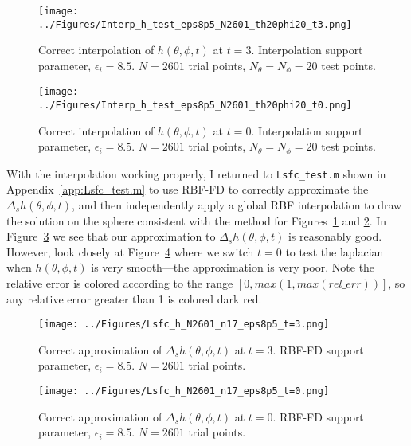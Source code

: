 \documentclass[letter,10pt]{article}
\begin{document}
\begin{figure}[h]
\begin{center} 
\texttt{[image: ../Figures/Interp\_h\_test\_eps8p5\_N2601\_th20phi20\_t3.png]}
\caption{Correct interpolation of $h(\theta,\phi,t)$ at $t=3$. Interpolation support parameter, $\epsilon_{i}=8.5$. $N=2601$ trial points, $N_{\theta} = N_{\phi} = 20$ test points. }
\label{fig:correct_h_at_t=3}
\end{center}
\end{figure}

\begin{figure}[h]
\begin{center} 
\texttt{[image: ../Figures/Interp\_h\_test\_eps8p5\_N2601\_th20phi20\_t0.png]}
\caption{Correct interpolation of $h(\theta,\phi,t)$ at $t=0$. Interpolation support parameter, $\epsilon_{i}=8.5$. $N=2601$ trial points, $N_{\theta} = N_{\phi} = 20$ test points. }
\label{fig:correct_h_at_t=0}
\end{center}
\end{figure}

With the interpolation working properly, I returned to \verb|Lsfc_test.m| shown in Appendix~\ref{app:Lsfc_test.m} to use RBF-FD to correctly approximate the $\Delta_{s} h(\theta,\phi,t)$, and then independently apply a global RBF interpolation to draw the solution on the sphere consistent with the method for Figures~\ref{fig:correct_h_at_t=3} and \ref{fig:correct_h_at_t=0}. In Figure~\ref{fig:eps8.5_Lsfc_at_t=3} we see that our approximation to $\Delta_{s} h(\theta,\phi,t)$ is reasonably good. However, look closely at Figure~\ref{fig:eps8.5_Lsfc_at_t=0} where we switch $t=0$ to test the laplacian when $h(\theta,\phi,t)$ is very smooth---the approximation is very poor. Note the relative error is colored according to the range $[0,max(1, max(rel\_err))]$, so any relative error greater than 1 is colored dark red.

\begin{figure}[h]
\begin{center}
\texttt{[image: ../Figures/Lsfc\_h\_N2601\_n17\_eps8p5\_t=3.png]}
\caption{Correct approximation of $\Delta_{s} h(\theta,\phi,t)$ at $t=3$. RBF-FD support parameter, $\epsilon_{i}=8.5$. $N=2601$ trial points. }
\label{fig:eps8.5_Lsfc_at_t=3}
\end{center}
\end{figure}


\begin{figure}[h]
\begin{center}
\texttt{[image: ../Figures/Lsfc\_h\_N2601\_n17\_eps8p5\_t=0.png]}
\caption{Correct approximation of $\Delta_{s} h(\theta,\phi,t)$ at $t=0$. RBF-FD support parameter, $\epsilon_{i}=8.5$. $N=2601$ trial points. }
\label{fig:eps8.5_Lsfc_at_t=0}
\end{center}
\end{figure}
\end{document}
